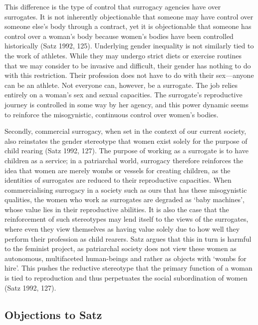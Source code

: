 This difference is the type of
control that surrogacy agencies have over surrogates. It is not
inherently objectionable that someone may have control over someone
else's body through a contract, yet it is objectionable that someone has
control over a woman's body because women's bodies have been controlled
historically (Satz 1992, 125). Underlying gender inequality is not similarly
tied to the work of athletes. While they may undergo strict diets or
exercise routines that we may consider to be invasive and difficult,
their gender has nothing to do with this restriction. Their profession
does not have to do with their sex---anyone can be an athlete. Not
everyone can, however, be a surrogate. The job relies entirely on a
woman's sex and sexual capacities. The surrogate's reproductive journey
is controlled in some way by her agency, and this power dynamic seems to
reinforce the misogynistic, continuous control over women's bodies.

Secondly, commercial surrogacy, when set in the context of our current
society, also reinstates the gender stereotype that women exist solely
for the purpose of child rearing (Satz 1992, 127). The purpose of working as
a surrogate is to have children as a service; in a patriarchal world,
surrogacy therefore reinforces the idea that women are merely wombs or
vessels for creating children, as the identities of surrogates are
reduced to their reproductive capacities. When commercialising surrogacy
in a society such as ours that has these misogynistic qualities, the
women who work as surrogates are degraded as `baby machines', whose
value lies in their reproductive abilities. It is also the case that the
reinforcement of such stereotypes may lend itself to the views of the
surrogates, where even they view themselves as having value solely due
to how well they perform their profession as child rearers. Satz argues
that this in turn is harmful to the feminist project, as patriarchal
society does not view these women as autonomous, multifaceted
human-beings and rather as objects with `wombs for hire'. This pushes
the reductive stereotype that the primary function of a woman is tied to
reproduction and thus perpetuates the social subordination of women
(Satz 1992, 127). 

\addtocounter{section}{1}
\subsection{Objections to Satz}

